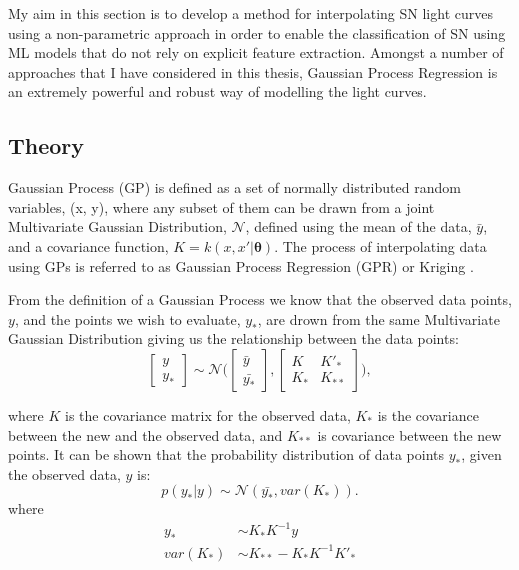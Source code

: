 My aim in this section is to develop a method for interpolating SN light curves using a non-parametric approach in order to enable the classification of SN using ML models that do not rely on explicit feature extraction. Amongst a number of approaches that I have considered in this thesis, Gaussian Process Regression is an extremely powerful and robust way of modelling the light curves.

\subsection{Theory}
Gaussian Process (GP) \citep{Rasmussen2006} is defined as a set of normally distributed random variables, (x, y), where any subset of them can be drawn from a joint Multivariate Gaussian Distribution, $\mathcal{N}$, defined using the mean of the data, $\bar{y}$, and a covariance function, $K = k(x, x'|\mathbf{\theta})$. The process of interpolating data using GPs is referred to as Gaussian Process Regression (GPR) or Kriging \citep{krige1951,Rasmussen2006,Ebden2015}.

From the definition of a Gaussian Process we know that the observed data points, $y$, and the points we wish to evaluate, $y_*$, are drown from the same Multivariate Gaussian Distribution giving us the relationship between the data points:
\begin{equation}
\begin{bmatrix} y \\ y_* \end{bmatrix} \sim \mathcal{N}\Biggl(\begin{bmatrix} \bar{y} \\ \bar{y_*} \end{bmatrix},\begin{bmatrix} K & K'_*\\
 K_* & K_{**} \end{bmatrix}\Biggr),
\end{equation}

\noindent where $K$ is the covariance matrix for the observed data, $K_*$ is the covariance between the new and the observed data, and $K_{**}$ is covariance between the new points. It can be shown \citep{Rasmussen2006} that the probability distribution of data points $y_*$, given the observed data, $y$ is:
\begin{equation}
p(y_*|y) \sim \mathcal{N}(\bar{y_*},var(K_*)).
\end{equation}
\noindent where
\begin{align}
y_* &\sim K_*K^{-1}y \\
var(K_*) &\sim K_{**}-K_*K^{-1}K'_*
\end{align}

